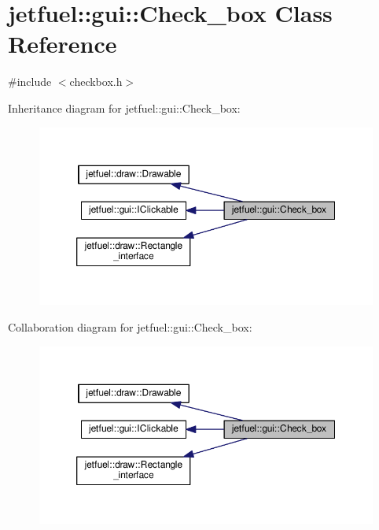 \hypertarget{classjetfuel_1_1gui_1_1Check__box}{}\section{jetfuel\+:\+:gui\+:\+:Check\+\_\+box Class Reference}
\label{classjetfuel_1_1gui_1_1Check__box}


{\ttfamily \#include $<$checkbox.\+h$>$}



Inheritance diagram for jetfuel\+:\+:gui\+:\+:Check\+\_\+box\+:\nopagebreak
\begin{figure}[H]
\begin{center}
\leavevmode
\includegraphics[width=350pt]{classjetfuel_1_1gui_1_1Check__box__inherit__graph}
\end{center}
\end{figure}


Collaboration diagram for jetfuel\+:\+:gui\+:\+:Check\+\_\+box\+:\nopagebreak
\begin{figure}[H]
\begin{center}
\leavevmode
\includegraphics[width=350pt]{classjetfuel_1_1gui_1_1Check__box__coll__graph}
\end{center}
\end{figure}
